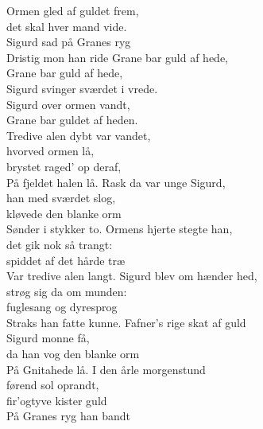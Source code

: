 \begin{flushleft}
Ormen gled af guldet frem,\\
det skal hver mand vide.\\
Sigurd sad på Granes ryg\\
Dristig mon han ride
\hops
\hspace{0.9cm}Grane bar guld af hede,\\
\hspace{0.9cm}Grane bar guld af hede,\\
\hspace{0.9cm}Sigurd svinger sværdet i vrede.\\
\hspace{0.9cm}Sigurd over ormen vandt,\\
\hspace{0.9cm}Grane bar guldet af heden.\\
\hops
Tredive alen dybt var vandet,\\
hvorved ormen lå,\\
brystet raged' op deraf,\\
På fjeldet halen lå.
\hops
Rask da var unge Sigurd,\\
han med sværdet slog,\\
kløvede den blanke orm\\
Sønder i stykker to.
\hops
Ormens hjerte stegte han,\\
det gik nok så trangt:\\
spiddet af det hårde træ\\
Var tredive alen langt.
\hops
Sigurd blev om hænder hed,\\
strøg sig da om munden:\\
fuglesang og dyresprog\\
Straks han fatte kunne.
\hops
Fafner's rige skat af guld\\
Sigurd monne få,\\
da han vog den blanke orm\\
På Gnitahede lå.
\hops
I den årle morgenstund\\
førend sol oprandt,\\
fir'ogtyve kister guld\\
På Granes ryg han bandt \\
\end{flushleft}